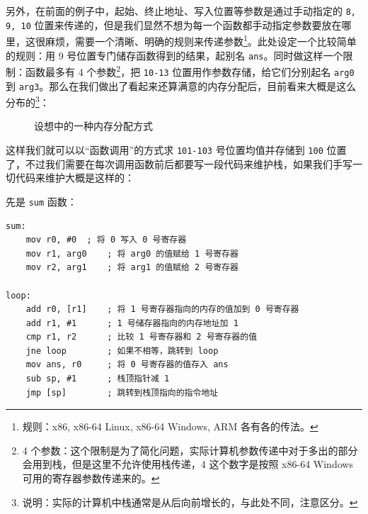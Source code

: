 另外，在前面的例子中，起始、终止地址、写入位置等参数是通过手动指定的 \texttt{8, 9, 10} 位置来传递的，但是我们显然不想为每一个函数都手动指定参数要放在哪里，这很麻烦，需要一个清晰、明确的规则来传递参数\footnote{规则：x86, x86-64 Linux, x86-64 Windows, ARM 各有各的传法。}。此处设定一个比较简单的规则：用 9 号位置专门储存函数得到的结果，起别名 \texttt{ans}。同时做这样一个限制：函数最多有 4 个参数\footnote{4 个参数：这个限制是为了简化问题，实际计算机参数传递中对于多出的部分会用到栈，但是这里不允许使用栈传递，4 这个数字是按照 x86-64 Windows 可用的寄存器参数传递来的。}，把 \texttt{10-13} 位置用作参数存储，给它们分别起名 \texttt{arg0} 到 \texttt{arg3}。那么在我们做出了看起来还算满意的内存分配后，目前看来大概是这么分布的\footnote{说明：实际的计算机中栈通常是从后向前增长的，与此处不同，注意区分。}：
\begin{figure}[H]
    \centering
    \caption{设想中的一种内存分配方式}
\end{figure}

这样我们就可以以“函数调用”的方式求 \texttt{101-103} 号位置均值并存储到 \texttt{100} 位置了，不过我们需要在每次调用函数前后都要写一段代码来维护栈，如果我们手写一切代码来维护大概是这样的：

先是 \texttt{sum} 函数：
\begin{verbatim}
sum:
    mov r0, #0  ; 将 0 写入 0 号寄存器
    mov r1, arg0    ; 将 arg0 的值赋给 1 号寄存器
    mov r2, arg1    ; 将 arg1 的值赋给 2 号寄存器

loop:
    add r0, [r1]    ; 将 1 号寄存器指向的内存的值加到 0 号寄存器
    add r1, #1      ; 1 号储存器指向的内存地址加 1
    cmp r1, r2      ; 比较 1 号寄存器和 2 号寄存器的值
    jne loop        ; 如果不相等，跳转到 loop
    mov ans, r0     ; 将 0 号寄存器的值存入 ans
    sub sp, #1      ; 栈顶指针减 1
    jmp [sp]        ; 跳转到栈顶指向的指令地址
\end{verbatim}

